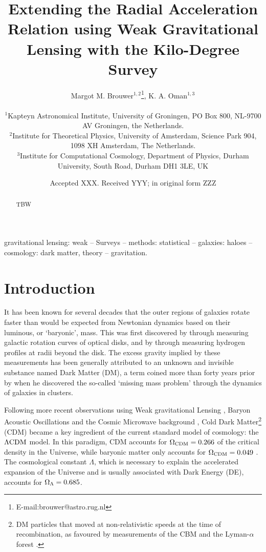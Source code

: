 \documentclass[usenatbib]{mnras}
\title[Extending the RAR with KiDS weak lensing]{Extending the Radial Acceleration Relation using Weak Gravitational Lensing with the Kilo-Degree Survey}
\author[M. M. Brouwer et al.]{Margot M. Brouwer$^{1,2}$\thanks{E-mail:brouwer@astro.rug.nl}, K. A. Oman$^{1,3}$
	\\
	\\
	$^{1}$Kapteyn Astronomical Institute, University of Groningen, PO Box 800, NL-9700 AV Groningen, the Netherlands.\\
	$^{2}$Institute for Theoretical Physics, University of Amsterdam, Science Park 904, 1098 XH Amsterdam, The Netherlands. \\
        $^{3}$Institute for Computational Cosmology, Department of Physics, Durham University, South Road, Durham DH1 3LE, UK \\
}
\date{Accepted XXX. Received YYY; in original form ZZZ}
\newcommand{\lcdm}{{\rm \Lambda CDM}}
\begin{document}
\label{firstpage}
\pagerange{\pageref{firstpage}--\pageref{lastpage}}
\maketitle

\begin{abstract}
TBW
\end{abstract}


\begin{keywords}
gravitational lensing: weak -- Surveys -- methods: statistical -- galaxies: haloes -- cosmology: dark matter, theory -- gravitation.
\\
\end{keywords}

\clearpage




\section{Introduction}
\label{sec:introduction}

It has been known for several decades that the outer regions of galaxies rotate faster than would be expected from Newtonian dynamics based on their luminous, or `baryonic', mass. This was first discovered by \cite{rubin1983} through measuring galactic rotation curves of optical disks, and by \cite{bosma1981} through measuring hydrogen profiles at radii beyond the disk. The excess gravity implied by these measurements has been generally attributed to an unknown and invisible substance named Dark Matter (DM), a term coined more than forty years prior by \cite{zwicky1937} when he discovered the so-called `missing mass problem' through the dynamics of galaxies in clusters.

Following more recent observations using Weak gravitational Lensing \cite[WL,][]{hoekstra2004,linden2014,mandelbaum2015}, Baryon Acoustic Oscillations \cite[BAO's,][]{eisenstein2005,blake2011} and the Cosmic Microwave background \cite[CMB,][]{spergel2003,planck2014}, Cold Dark Matter\footnote{DM particles that moved at non-relativistic speeds at the time of recombination, as favoured by measurements of the CBM \cite[]{planck2014} and the Lyman-$\alpha$ forest \cite[]{viel2013}.} (CDM) became a key ingredient of the current standard model of cosmology: the $\lcdm$ model. In this paradigm, CDM accounts for $\Omega_{\rm CDM}=0.266$ of the critical density in the Universe, while baryonic matter only accounts for $\Omega_{\rm CDM}=0.049$ \cite[]{planck2018}. The cosmological constant $\Lambda$, which is necessary to explain the accelerated expansion of the Universe and is usually associated with Dark Energy (DE), accounts for $\Omega_{\rm \Lambda}=0.685$.
\end{document}
